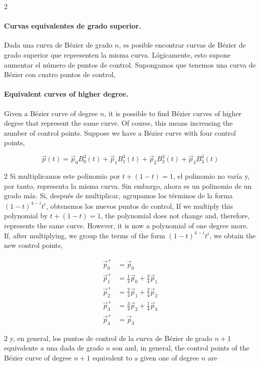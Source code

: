 \begin{paracol}{2}
\paragraph{Curvas equivalentes de grado superior.} Dada una curva de Bézier de grado $n$, es posible encontrar curvas de Bézier de grado superior que representen la misma curva. Lógicamente, esto supone aumentar el número de puntos de control. Supongamos que tenemos una curva de Bézier con cuatro puntos de control,
\switchcolumn
\paragraph{Equivalent curves of higher degree.} Given a Bézier curve of degree $n$, it is possible to find Bézier curves of higher degree that represent the same curve. Of course, this means increasing the number of control points. Suppose we have a Bézier curve with four control points,
\end{paracol}
\begin{equation*}
\vec{p}(t) = \vec{p}_0B_0^3(t) + \vec{p}_1B_1^3(t) + \vec{p}_2B_2^3(t) + \vec{p}_3B_3^3(t)
\end{equation*}
\begin{paracol}{2}
Si multiplicamos este polinomio por $t + (1 -t) = 1$, el polinomio no varía y, por tanto, representa la misma curva. Sin embargo, ahora es un polinomio de un grado más. Si, después de multiplicar, agrupamos los términos de la forma $(1-t)^{4-i}t^i$, obtenemos los nuevos puntos de control,
\switchcolumn
If we multiply this polynomial by $t + (1 -t) = 1$, the polynomial does not change and, therefore, represents the same curve. However, it is now a polynomial of one degree more. If, after multiplying, we group the terms of the form $(1-t)^{4-i}t^i$, we obtain the new control points,
\end{paracol}
\begin{align*}
\vec{p}_0^+&= \vec{p}_0\\
\vec{p}_1^+&= \frac{1}{4}\vec{p}_0 + \frac{3}{4}\vec{p}_1\\
\vec{p}_2^+&= \frac{2}{4}\vec{p}_1 + \frac{2}{4}\vec{p}_2\\
\vec{p}_3^+&= \frac{3}{4}\vec{p}_2 + \frac{1}{4}\vec{p}_3\\
\vec{p}_4^+&= \vec{p}_3
\end{align*}
\begin{paracol}{2}
y, en general, los puntos de control de la curva de Bézier de grado $n+1$ equivalente a una dada de grado $n$ son
\switchcolumn
and, in general, the control points of the Bézier curve of degree $n+1$ equivalent to a given one of degree $n$ are
\end{paracol}
